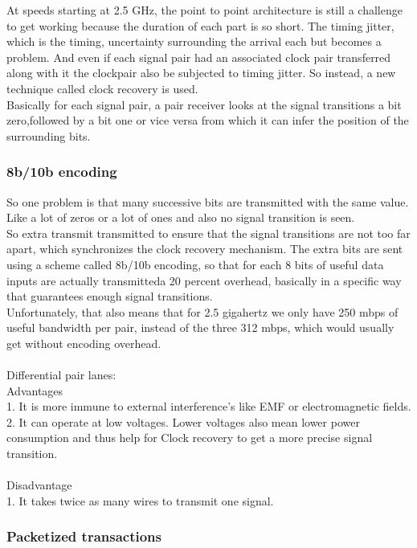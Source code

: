 At speeds starting at 2.5 GHz, the point to point architecture is still a challenge to get working because the duration of each part is so short. The timing jitter, which is the timing, uncertainty surrounding the arrival each but becomes a problem. And even if each signal pair had an associated clock pair transferred along with it the clockpair also be subjected to timing jitter. So instead, a new technique called clock recovery is used.\\
Basically for each signal pair, a pair receiver looks at the signal transitions a bit zero,followed by a bit one or vice versa from which it can infer the position of the surrounding bits.

\subsubsection{8b/10b encoding}
So one problem is that many successive bits are transmitted with the same value. Like a lot of zeros or a lot of ones and also no signal transition is seen.\\
So extra transmit transmitted to ensure that the signal transitions are not too far apart, which synchronizes the clock recovery mechanism. The extra bits are sent using a scheme called 8b/10b encoding, so that for each 8 bits of useful data inputs are actually transmitteda 20 percent overhead, basically in a specific way that guarantees enough signal transitions.\\
Unfortunately, that also means that for 2.5 gigahertz we only have 250 mbps of useful bandwidth per pair, instead of the three 312 mbps, which would usually get without encoding overhead.\\\\
Differential pair lanes:\\
Advantages\\
1. It is more immune to external interference's like EMF or electromagnetic fields.\\
2. It can operate at low voltages. Lower voltages also mean lower power consumption and thus help for Clock recovery to get a more precise signal transition. \\\\
Disadvantage\\
1. It takes twice as many wires to transmit one signal.\\
\subsubsection{Packetized transactions}

